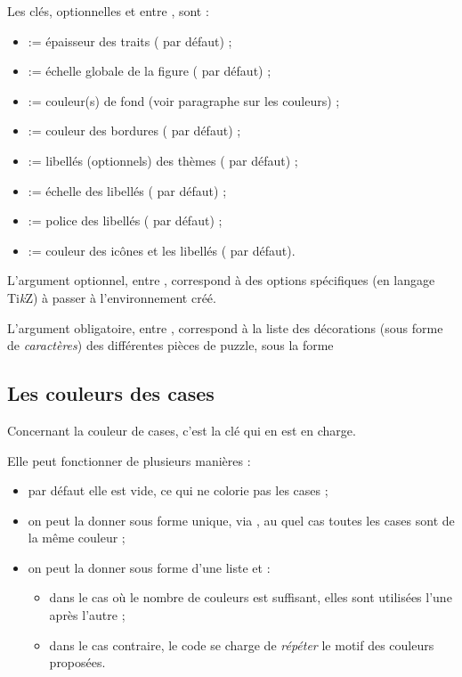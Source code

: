 \documentclass[11pt,a4paper]{ltxdoc}
\providecommand\tikzlogo{Ti\textit{k}Z}
\let\TikZ\tikzlogo
\begin{document}
Les \textsf{clés}, optionnelles et entre \MontreCode{[...]}, sont :

\begin{itemize}
	\item {} := épaisseur des traits (\MontreCode{1pt} par défaut) ;
	\item {} := échelle globale de la figure ( par défaut) ;
	\item {} := couleur(s) de fond (voir paragraphe sur les couleurs) ;
	\item {} := couleur des bordures ( par défaut) ;
	\item {} := libellés (optionnels) des thèmes (\MontreCode{\{\}} par défaut) ;
	\item {} := échelle des libellés ( par défaut) ;
	\item {} := police des libellés ( par défaut) ;
	\item {} := couleur des icônes et les libellés ( par défaut).
\end{itemize}

\medskip

L'argument optionnel, entre , correspond à des options spécifiques (en langage \TikZ) à passer à l'environnement créé.

\smallskip

L'argument obligatoire, entre , correspond à la liste des décorations (sous forme de \textit{caractères}) des différentes pièces de puzzle, sous la forme 

\subsection{Les couleurs des cases}

Concernant la couleur de cases, c'est la clé  qui en est en charge.

Elle peut fonctionner de plusieurs manières :

\begin{itemize}
	\item par défaut elle est vide, ce qui ne colorie pas les cases ;
	\item on peut la donner sous forme unique, via , au quel cas toutes les cases sont de la même couleur ;
	\item on peut la donner sous forme d'une liste  et :
	\begin{itemize}
		\item dans le cas où le nombre de couleurs est suffisant, elles sont utilisées l'une après l'autre ;
		\item dans le cas contraire, le code se charge de \textit{répéter} le motif des couleurs proposées.
	\end{itemize}
\end{itemize}
\end{document}

